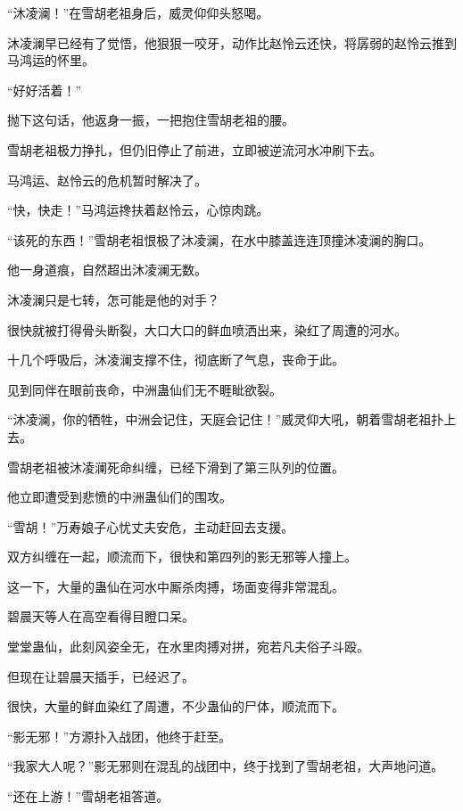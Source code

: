 
\begin{this_body}

“沐凌澜！”在雪胡老祖身后，威灵仰仰头怒喝。

沐凌澜早已经有了觉悟，他狠狠一咬牙，动作比赵怜云还快，将孱弱的赵怜云推到马鸿运的怀里。

“好好活着！”

抛下这句话，他返身一振，一把抱住雪胡老祖的腰。

雪胡老祖极力挣扎，但仍旧停止了前进，立即被逆流河水冲刷下去。

马鸿运、赵怜云的危机暂时解决了。

“快，快走！”马鸿运搀扶着赵怜云，心惊肉跳。

“该死的东西！”雪胡老祖恨极了沐凌澜，在水中膝盖连连顶撞沐凌澜的胸口。

他一身道痕，自然超出沐凌澜无数。

沐凌澜只是七转，怎可能是他的对手？

很快就被打得骨头断裂，大口大口的鲜血喷洒出来，染红了周遭的河水。

十几个呼吸后，沐凌澜支撑不住，彻底断了气息，丧命于此。

见到同伴在眼前丧命，中洲蛊仙们无不睚眦欲裂。

“沐凌澜，你的牺牲，中洲会记住，天庭会记住！”威灵仰大吼，朝着雪胡老祖扑上去。

雪胡老祖被沐凌澜死命纠缠，已经下滑到了第三队列的位置。

他立即遭受到悲愤的中洲蛊仙们的围攻。

“雪胡！”万寿娘子心忧丈夫安危，主动赶回去支援。

双方纠缠在一起，顺流而下，很快和第四列的影无邪等人撞上。

这一下，大量的蛊仙在河水中厮杀肉搏，场面变得非常混乱。

碧晨天等人在高空看得目瞪口呆。

堂堂蛊仙，此刻风姿全无，在水里肉搏对拼，宛若凡夫俗子斗殴。

但现在让碧晨天插手，已经迟了。

很快，大量的鲜血染红了周遭，不少蛊仙的尸体，顺流而下。

“影无邪！”方源扑入战团，他终于赶至。

“我家大人呢？”影无邪则在混乱的战团中，终于找到了雪胡老祖，大声地问道。

“还在上游！”雪胡老祖答道。


\end{this_body}
